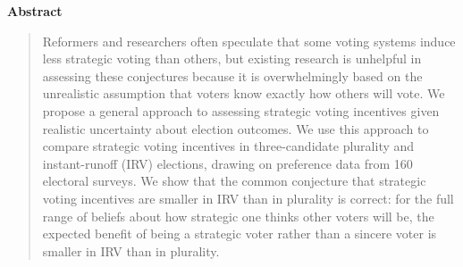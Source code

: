 \documentclass[11pt,a4paper]{article}
\newcommand{\revertstretch}{\setstretch{1.7}}
\begin{document}
\begin{center}
\textbf{Abstract}
\end{center}
\begin{quotation}\singlespacing
\noindent %
Reformers and researchers often speculate that some voting systems induce less strategic voting than others, but existing research is unhelpful in assessing these conjectures because it is overwhelmingly based on the unrealistic assumption that voters know exactly how others will vote. We propose a general approach to assessing strategic voting incentives given realistic uncertainty about election outcomes. We use this approach to compare strategic voting incentives in three-candidate plurality and instant-runoff (IRV) elections, drawing on preference data from 160 electoral surveys. We show that the common conjecture that strategic voting incentives are smaller in IRV than in plurality is correct: for the full range of beliefs about how strategic one thinks other voters will be, the expected benefit of being a strategic voter rather than a sincere voter is smaller in IRV than in plurality. %
\end{quotation}
\revertstretch
\end{document}

